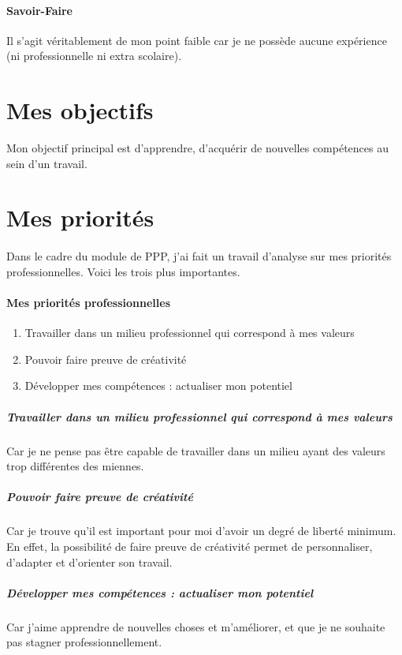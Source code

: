 \documentclass[a4paper,12pt, draft]{report}
\begin{document}
\paragraph{Savoir-Faire}
Il s'agit véritablement de mon point faible car je ne possède aucune expérience (ni professionnelle ni extra scolaire).

\section{Mes objectifs}
Mon objectif principal est d'apprendre, d'acquérir de nouvelles compétences au sein d'un travail.
\section{Mes priorités}
\paragraph{}
Dans le cadre du module de PPP, j'ai fait un travail d'analyse sur mes priorités professionnelles. Voici les trois plus importantes.


\paragraph{Mes priorités professionnelles}
\begin{enumerate}
\item Travailler dans un milieu professionnel qui correspond à mes valeurs
\item Pouvoir faire preuve de créativité
\item Développer mes compétences : actualiser mon potentiel
\end{enumerate}


\paragraph{}
\subparagraph{Travailler dans un milieu professionnel qui correspond à mes valeurs}
Car je ne pense pas être capable de travailler dans un milieu ayant des valeurs trop différentes des miennes. 

\subparagraph{Pouvoir faire preuve de créativité}
Car je trouve qu'il est important pour moi d'avoir un degré de liberté minimum. En effet, la possibilité de faire preuve de créativité permet de personnaliser, d'adapter et d'orienter son travail.

\subparagraph{Développer mes compétences : actualiser mon potentiel}
Car j'aime apprendre de nouvelles choses et m'améliorer, et que je ne souhaite pas stagner professionnellement.
\end{document}
